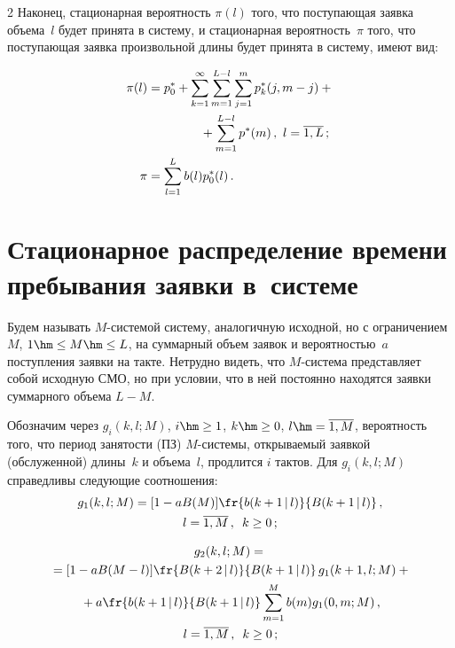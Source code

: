 \begin{multicols}{2}
Наконец, стационарная вероятность $\pi(l)$ того, что поступающая
заявка объема~$l$ будет принята в сис\-те\-му, и стационарная
вероятность~$\pi$ того, что по\-сту\-па\-ющая заявка
произвольной длины будет принята в сис\-те\-му, имеют вид:

\noindent
\begin{align*}
\pi(l)&= p^*_0 + \sum\limits_{k=1}^\infty \sum\limits_{m=1}^{L-l}
\sum\limits_{j=1}^{m} p^*_{k}(j,m-j) +{}\\
&\hspace*{15mm}{}+\sum\limits_{m=1}^{L-l} p^*(m)\,,\  l= \overline{1,L}\,;
\\
\pi &= \sum\limits_{l=1}^{L} b(l) p^*_0(l) \,.
\end{align*}

\section{Стационарное распределение времени
пребывания заявки в~системе}


Будем называть $M$-системой систему, аналогичную
исходной, но с ограничением~$M$, ${1\hm\le M\hm\le L}$,
на суммарный объем заявок и вероятностью~$a$
поступления заявки на такте. Нетрудно видеть, что $M$-сис\-те\-ма представляет собой
исходную СМО, но при условии, что в ней постоянно
находятся заявки суммарного объема $L-M$.


Обозначим через $g_i(k,l;M)$, $i\hm\ge 1$,
$k\hm\ge 0$, $l\hm=\overline{1,M}$,
вероятность того, что период занятости (ПЗ) $M$-сис\-те\-мы,
открываемый заявкой (обслуженной) длины~$k$ и объема~$l$,
продлится $i$ тактов. Для $g_i(k,l;M)$ справедливы следующие соотношения:
\begin{multline}
\label{4.1}
g_1(k,l;M) = [1 - a B(M)]\fr{b(k+1\,|\,l)}{B(k+1\,|\,l)}\,,\\
l= \overline{1,M}\,,\enskip  k\ge 0\,;
\end{multline}

\vspace*{-9pt}

\noindent
\begin{multline}
\label{4.2}
g_2(k,l;M)={}\\
{}= [1 - a B(M-l)]\fr{B(k+2\,|\,l) }{B(k+1\,|\,l)}
\, g_{1}(k+1,l;M)+{}\\
{}+
a \fr{b(k+1\,|\,l) }{ B(k+1\,|\,l)} \sum\limits_{m=1}^{M}
b(m) g_{1}(0,m;M)\,,\\  l= \overline{1,M}\,,\enskip  k\ge 0\,;
\end{multline}


\end{multicols}
